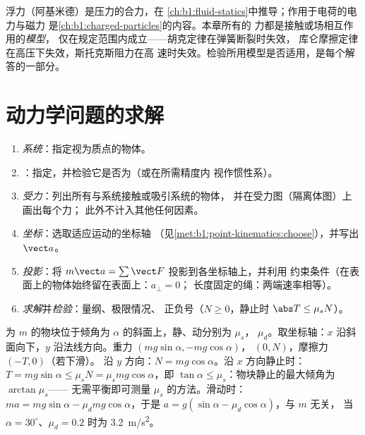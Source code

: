 \begin{remark}[其他力]\label{rem:b1:newton-dynamics:others}
浮力（阿基米德）是压力的合力，在
\cref{ch:b1:fluid-statics}中推导；作用于电荷的电力与磁力
是\cref{ch:b1:charged-particles}的内容。本章所有的
力都是接触或场相互作用的\emph{模型}，
仅在规定范围内成立——胡克定律在弹簧断裂时失效，
库仑摩擦定律在高压下失效，斯托克斯阻力在高
速时失效。检验所用模型是否适用，是每个解答的一部分。
\end{remark}

\section{动力学问题的求解}

\begin{method}[从情境到方程]\label{met:b1:newton-dynamics:method}
\begin{enumerate}
  \item \emph{系统}：指定视为质点的物体。
  \item \emph{}：指定，并检验它是否为（或在所需精度内
        视作惯性系）。
  \item \emph{受力}：列出所有与系统接触或吸引系统的物体，
        并在受力图（隔离体图）上画出每个力；
        此外不计入其他任何因素。
  \item \emph{坐标}：选取适应运动的坐标轴
        （见\cref{met:b1:point-kinematics:choose}），并写出 $\vect a$。
  \item \emph{投影}：将 $m\vect a = \sum\vect F$ 投影到各坐标轴上，并利用
        约束条件（在表面上的物体始终留在表面上：$a_\perp = 0$；
        长度固定的绳：两端速率相等）。
  \item \emph{求解}并\emph{检验}：量纲、极限情况、
        正负号（$N \geq 0$，静止时 $\abs T \leq \mu_sN$）。
\end{enumerate}
\end{method}

\begin{example}[斜面上的物块]\label{ex:b1:newton-dynamics:incline}
为 $m$ 的物块位于倾角为 $\alpha$ 的斜面上，静、动分别为 $\mu_s$，
$\mu_d$。取坐标轴：$x$ 沿斜面向下，$y$ 沿法线方向。重力
$(mg\sin\alpha, -mg\cos\alpha)$， $(0, N)$，摩擦力 $(-T, 0)$（若下滑）。
沿 $y$ 方向：$N = mg\cos\alpha$。沿 $x$ 方向静止时：
$T = mg\sin\alpha \leq \mu_sN = \mu_smg\cos\alpha$，即 $\tan\alpha
\leq \mu_s$：物块静止的最大倾角为 $\arctan\mu_s$——
无需平衡即可测量 $\mu_s$ 的方法。滑动时：$ma = mg\sin\alpha -
\mu_dmg\cos\alpha$，于是 $a = g(\sin\alpha - \mu_d\cos\alpha)$，与 $m$ 无关，
当 $\alpha = 30^\circ$、$\mu_d = 0.2$ 时为 \qty{3.2}{m/s^2}。
\end{example}

